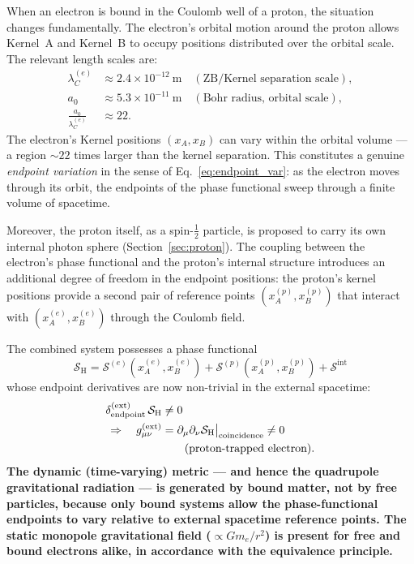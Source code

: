\documentclass[%
 reprint, amsmath,amssymb, aps, prd, ]{revtex4-2}
\numberwithin{equation}{section}
\begin{document}
When an electron is bound in the Coulomb well of a proton, the situation changes fundamentally.
The electron's orbital motion around the proton allows Kernel~A and Kernel~B to occupy positions distributed over the orbital scale.
The relevant length scales are:
\begin{align}
\lambda_C^{(e)} &\approx 2.4\times10^{-12}\ \text{m}
\quad (\text{ZB/Kernel separation scale}),
\label{eq:lambdaCe}\\
a_0 &\approx 5.3\times10^{-11}\ \text{m}
\quad (\text{Bohr radius, orbital scale}),
\label{eq:a0}\\
\frac{a_0}{\lambda_C^{(e)}} &\approx 22.
\label{eq:scale_ratio}
\end{align}
The electron's Kernel positions $(x_A, x_B)$ can vary within the orbital volume --- a region $\sim 22$ times larger than the kernel separation.
This constitutes a genuine \emph{endpoint variation} in the sense of Eq.~\eqref{eq:endpoint_var}: as the electron moves through its orbit, the endpoints of the phase functional sweep through a finite volume of spacetime.

Moreover, the proton itself, as a spin-$\frac{1}{2}$ particle, is proposed to carry its own internal photon sphere (Section~\ref{sec:proton}).
The coupling between the electron's phase functional and the proton's internal structure introduces an additional degree of freedom in the endpoint positions: the proton's kernel positions provide a second pair of reference points $(x_A^{(p)}, x_B^{(p)})$ that interact with $(x_A^{(e)}, x_B^{(e)})$ through the Coulomb field.

The combined system possesses a phase functional
\begin{equation}
\mathcal{S}_\mathrm{H}
= \mathcal{S}^{(e)}(x_A^{(e)}, x_B^{(e)})
+ \mathcal{S}^{(p)}(x_A^{(p)}, x_B^{(p)})
+ \mathcal{S}^\mathrm{int}
\label{eq:S_hydrogen}
\end{equation}
whose endpoint derivatives are now non-trivial in the external spacetime:
\begin{align}
\delta_\mathrm{endpoint}^{(\mathrm{ext})}\,\mathcal{S}_\mathrm{H}
&\neq 0
\notag\\
\Rightarrow\quad
g_{\mu\nu}^{(\mathrm{ext})}
&= \partial_\mu\partial_\nu \mathcal{S}_\mathrm{H}
  \big|_\mathrm{coincidence}
\neq 0
\notag\\
&\qquad (\text{proton-trapped electron}).
\label{eq:trapped_metric}
\end{align}
\textbf{The dynamic (time-varying) metric --- and hence the quadrupole gravitational radiation --- is generated by bound matter, not by free particles, because only bound systems allow the phase-functional endpoints to vary relative to external spacetime reference points. The static monopole gravitational field ($\propto Gm_e/r^2$) is present for free and bound electrons alike, in accordance with the equivalence principle.}
\end{document}
